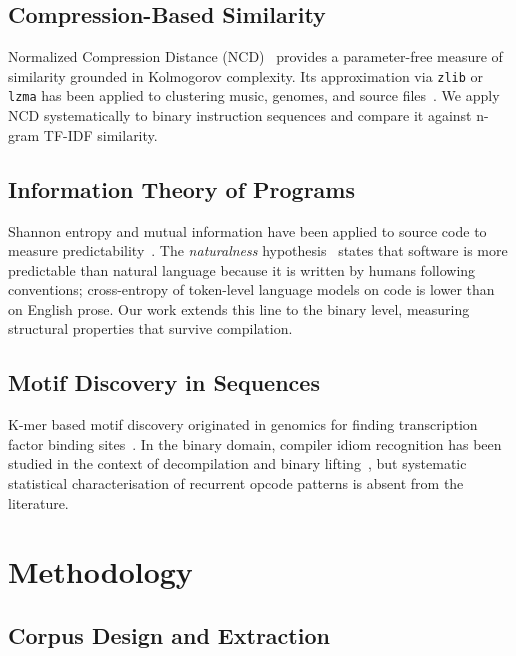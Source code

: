 \documentclass[10pt,twocolumn]{article}
\newcommand{\zlib}{\texttt{zlib}}
\newcommand{\lzma}{\texttt{lzma}}
\begin{document}
\subsection{Compression-Based Similarity}

Normalized Compression Distance (NCD)~\cite{cilibrasi2005clustering} provides
a parameter-free measure of similarity grounded in Kolmogorov complexity.  Its
approximation via \zlib{} or \lzma{} has been applied to clustering music,
genomes, and source files~\cite{cilibrasi2005clustering}.  We apply NCD
systematically to binary instruction sequences and compare it against n-gram
TF-IDF similarity.

\subsection{Information Theory of Programs}

Shannon entropy and mutual information have been applied to source code to
measure predictability~\cite{hindle2012naturalness,tu2014localness}.  The
\emph{naturalness} hypothesis~\cite{hindle2012naturalness} states that
software is more predictable than natural language because it is written by
humans following conventions; cross-entropy of token-level language models on
code is lower than on English prose.  Our work extends this line to the
binary level, measuring structural properties that survive compilation.

\subsection{Motif Discovery in Sequences}

K-mer based motif discovery originated in genomics for finding transcription
factor binding sites~\cite{das2007survey}.  In the binary domain, compiler
idiom recognition has been studied in the context of decompilation and binary
lifting~\cite{schulte2018evolving}, but systematic statistical characterisation
of recurrent opcode patterns is absent from the literature.

\section{Methodology}
\label{sec:methodology}

\subsection{Corpus Design and Extraction}
\end{document}
